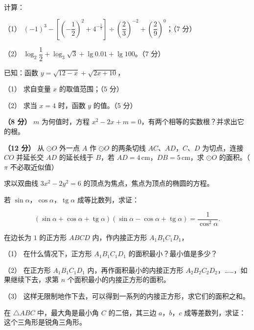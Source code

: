 \begin{question}
计算：

（1） $(-1)^3-\left[\left(-\dfrac12\right)^2+4^{-\frac12}\right]\div\left(\dfrac23\right)^{-2}+\left(\dfrac29\right)^0$；（7 分）

（2） $\log_2\dfrac12+\log_3\sqrt3+\lg0.01+\lg100$。（7 分）

\end{question}
\begin{question}
已知：函数 $y=\sqrt{12-x}+\sqrt{2x+10}$，

（1） 求自变量 $x$ 的取值范围；（5 分）

（2） 求当 $x=4$ 时，函数 $y$ 的值。（5 分）

\end{question}
\begin{question}
\textbf{（8 分）} $m$ 为何值时，方程 $x^2-2x+m=0$，有两个相等的实数根？并求出它的根。

\Needspace{0.4\textheight}
\end{question}
\begin{question}
\textbf{（12 分）} 从 $\odot O$ 外一点 $A$ 作 $\odot O$ 的两条切线 $AC\text{、}AD$，$C\text{、}D$ 为切点，连接 $CO$ 并延长交 $AD$ 的延长线于 $B$，若 $AD=4\,\mathrm{cm}$，$DB=5\,\mathrm{cm}$，求 $\odot O$ 的面积。（$\pi$ 不必取近似值）
\nopagebreak[4]
\begin{center}\end{center}
\nopagebreak[4]
\end{question}
\begin{question}
求以双曲线 $3x^2-2y^2=6$ 的顶点为焦点，焦点为顶点的椭圆的方程。

\end{question}
\begin{question}
若 $\sin\alpha\text{，}\cos\alpha\text{，}\operatorname{tg}\alpha$ 成等比数列，求证：

\nopagebreak[4]
\[
(\sin\alpha+\cos\alpha+\operatorname{tg}\alpha)(\sin\alpha-\cos\alpha+\operatorname{tg}\alpha)=\frac1{\cos^2\alpha}.
\]

\Needspace{0.4\textheight}
\end{question}
\begin{question}
在边长为 $1$ 的正方形 $ABCD$ 内，作内接正方形 $A_1B_1C_1D_1$，

（1） 在什么情况下，正方形 $A_1B_1C_1D_1$ 的面积最小？最小值是多少？

（2） 在正方形 $A_1B_1C_1D_1$ 内，再作面积最小的内接正方形 $A_2B_2C_2D_2$，……，如果继续下去，求第 $n$ 个面积最小的内接正方形的面积。

（3） 这样无限制地作下去，可以得到一系列的内接正方形，求它们的面积之和。
\nopagebreak[4]
\begin{center}\end{center}
\nopagebreak[4]
\end{question}
\begin{question}
在 $\triangle ABC$ 中，最大角是最小角 $C$ 的二倍，其三边 $a\text{，}b\text{，}c$ 成等差数列，求证：这个三角形是锐角三角形。

\end{question}